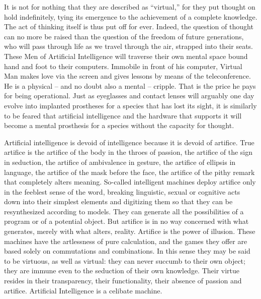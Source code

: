 \documentclass[10pt,twoside,openany]{memoir}
\begin{document}
It is not for nothing that they are described as ``virtual,'' for they put thought on hold indefinitely, tying its emergence to the achievement of a complete knowledge. The act of thinking itself is thus put off for ever. Indeed, the question of thought can no more be raised than the question of the freedom of future generations, who will pass through life as we travel through the air, strapped into their seats. These Men of Artificial Intelligence will traverse their own mental space bound hand and foot to their computers. Immobile in front of his computer, Virtual Man makes love via the screen and gives lessons by means of the teleconference. He is a physical -- and no doubt also a mental -- cripple. That is the price he pays for being operational. Just as eyeglasses and contact lenses will arguably one day evolve into implanted prostheses for a species that has lost its sight, it is similarly to be feared that artificial intelligence and the hardware that supports it will become a mental prosthesis for a species without the capacity for thought.

Artificial intelligence is devoid of intelligence because it is devoid of artifice. True artifice is the artifice of the body in the throes of passion, the artifice of the sign in seduction, the artifice of ambivalence in gesture, the artifice of ellipsis in language, the artifice of the mask before the face, the artifice of the pithy remark that completely alters meaning. So-called intelligent machines deploy artifice only in the feeblest sense of the word, breaking linguistic, sexual or cognitive acts down into their simplest elements and digitizing them so that they can be resynthesized according to models. They can generate all the possibilities of a program or of a potential object. But artifice is in no way concerned with what generates, merely with what alters, reality. Artifice is the power of illusion. These machines have the artlessness of pure calculation, and the games they offer are based solely on commutations and combinations. In this sense they may be said to be virtuous, as well as virtual: they can never succumb to their own object; they are immune even to the seduction of their own knowledge. Their virtue resides in their transparency, their functionality, their absence of passion and artifice. Artificial Intelligence is a celibate machine. 
\end{document}
